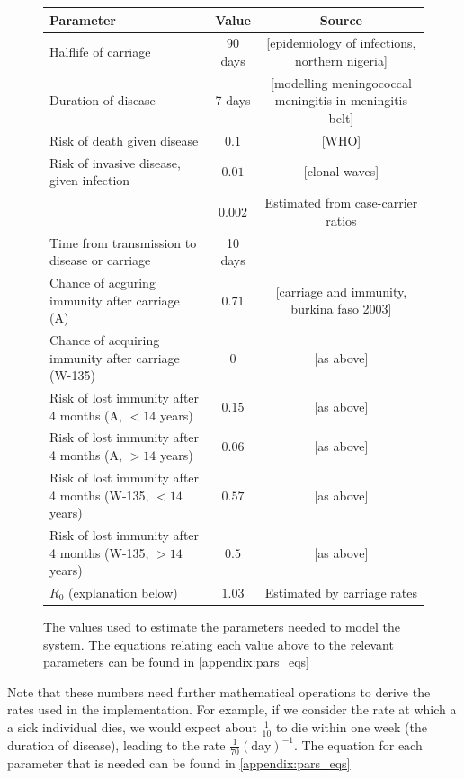 \documentclass[10pt,a4paper]{article}
\begin{document}
\begin{figure}[h]
	\begin{tabular}{|l|c|c|}
		\hline
			Parameter 													& Value			& Source 														\\ \hline
			Halflife of carriage										& 90 days		& [epidemiology of infections, northern nigeria]				\\
			Duration of disease											& 7 days		& [modelling meningococcal meningitis in meningitis belt]		\\
			Risk of death given disease									& $0.1$			& [WHO]															\\
			Risk of invasive disease, given infection					& $0.01$		& [clonal waves]												\\
																		& $0.002$		& Estimated from case-carrier ratios							\\			
			Time from transmission to disease or carriage				& 10 days		&																\\
			Chance of acguring immunity after carriage (A)				& $0.71$		& [carriage and immunity, burkina faso 2003]					\\
			Chance of acquiring immunity after carriage (W-135)		& $0$			& [as above]													\\
			Risk of lost immunity after 4 months (A, $<14$ years)		& $0.15$		& [as above]													\\
			Risk of lost immunity after 4 months (A, $>14$ years)		& $0.06$		& [as above]													\\
			Risk of lost immunity after 4 months (W-135, $<14$ years)	& $0.57$		& [as above]													\\
			Risk of lost immunity after 4 months (W-135, $>14$ years)	& $0.5$			& [as above]													\\
			$R_0$ (explanation below)									& $1.03$		& Estimated by carriage rates									\\ \hline
	\end{tabular}
	\caption{The values used to estimate the parameters needed to model the system. The equations relating each value above to the relevant parameters can be found in \cref{appendix:pars_eqs}} \label{table:pars:disease}
\end{figure}

Note that these numbers need further mathematical operations to derive the rates used in the implementation. For example, if we consider the rate at which a a sick individual dies, we would expect about $\frac{1}{10}$ to die within one week (the duration of disease), leading to the rate $\frac{1}{70} \left( \textrm{day} \right)^{-1}$. The equation for each parameter that is needed can be found in \cref{appendix:pars_eqs}
\end{document}
